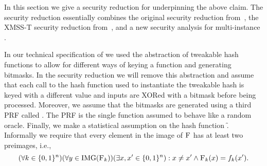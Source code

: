 

%
%

In this section we give a security reduction for \spx underpinning the above
claim. The security reduction essentially combines the original \spc security
reduction from~\cite{Bernstein2015}, the XMSS-T security reduction
from~\cite{Huelsing2016}, and a new security analysis for multi-instance \fors.

In our technical specification of \spx we used the abstraction of tweakable
hash functions to allow for different ways of keying a function and
generating bitmasks. In the security reduction we will remove this abstraction
and assume that each call to the hash function used to instantiate the
tweakable hash is keyed with a different value and inputs are XORed with a
bitmask before being processed. Moreover, we assume that the bitmasks are
generated using a third PRF called \prfbm. The PRF \prfbm is the single function
assumed to behave like a random oracle. Finally, we make a statistical
assumption on the hash function \f. Informally we require that every element
in the image of $\textsc{F}$ has at least two preimages, i.e.,
\begin{equation}\label{req:f}
 (\forall k \in \{0,1\}^n)(\forall y \in \mathrm{IMG}(\textsc{F}_k)) (\exists x, x' \in \{0,1\}^n): x \neq x' \wedge \textsc{F}_k(x) = f_k(x').
\end{equation}

